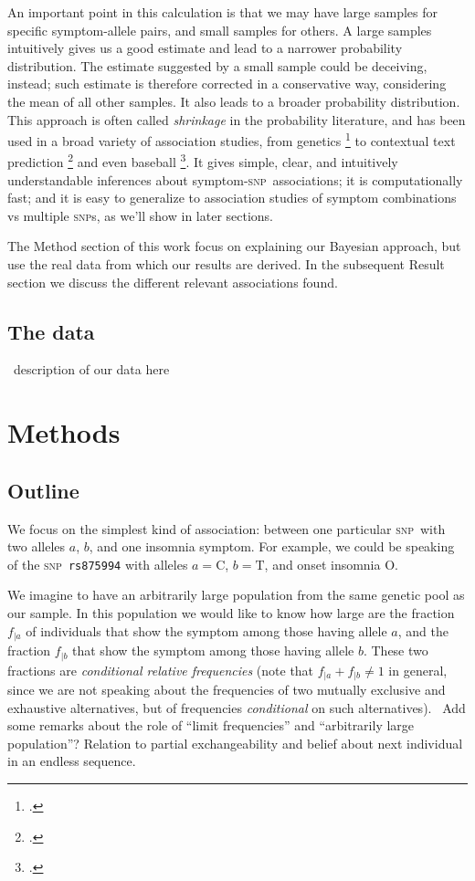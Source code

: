 \documentclass[\ifafour a4paper,12pt,\else a5paper,10pt,\fi%
onecolumn,oneside,article,%
british%
]{memoir}
\theoremstyle{remark}
\theoremstyle{innote}
\newcommand*{\citep}{\footcites}
\renewcommand*{\|}[1][]{\nonscript\,#1\vert\nonscript\;\mathopen{}}
\newcommand*{\puzzle}{{\fontencoding{U}\fontfamily{fontawesometwo}\selectfont\symbol{225}}}
\newcommand{\mynote}[1]{ {\color{notecolour}\puzzle\ #1}}
\newcommand*{\rs}{\texttt}
\newcommand*{\snp}{\textsc{snp}}
\newcommand*{\ya}{a}
\newcommand*{\yb}{b}
\newcommand*{\ysO}{\textrm{O}}%
\begin{document}
An important point in this calculation is that we may have large samples
for specific symptom-allele pairs, and small samples for others. A large
samples intuitively gives us a good estimate and lead to a narrower
probability distribution. The estimate suggested by a small sample could be
deceiving, instead; such estimate is therefore corrected in a conservative
way, considering the mean of all other samples. It also leads to a broader
probability distribution. This approach is often called \emph{shrinkage} in
the probability literature, and has been used in a broad variety of
association studies, from genetics \citep{lange1995,lockwoodetal2001} to
contextual text prediction \citep{mackayetal1995} and even baseball
\citep{jiangetal2010}. It gives simple, clear, and intuitively
understandable inferences about symptom-\snp\ associations; it is
computationally fast; and it is easy to generalize to association studies
of symptom combinations vs multiple \snp s, as we'll show in
later sections.

The Method section of this work focus on explaining our Bayesian approach,
but use the real data from which our results are derived. In the subsequent
Result section we discuss the different relevant associations found.


\subsection{The data}
\label{sec:data}

\mynote{description of our data here}

\section{Methods}
\label{sec:methods}

\subsection{Outline}
\label{sec:method_outline}

We focus on the simplest kind of association: between one particular \snp\
with two alleles $\ya$, $\yb$, and one insomnia symptom. For example, we
could be speaking of the \snp\ \rs{rs875994} with alleles $\ya=\textrm{C}$,
$\yb=\textrm{T}$, and onset insomnia $\ysO$.

We imagine to have an arbitrarily large population from the same genetic
pool as our sample. In this population we would like to know how large are
the fraction $f_{|\ya}$ of individuals that show the symptom among those
having allele $\ya$, and the fraction $f_{|\yb}$ that show the symptom among
those having allele $\yb$. These two fractions are \emph{conditional
  relative frequencies} (note that $f_{|\ya}+f_{|\yb} \ne 1$ in general,
since we are not speaking about the frequencies of two mutually exclusive
and exhaustive alternatives, but of frequencies \emph{conditional} on such
alternatives). \mynote{Add some remarks about the role of \enquote{limit
    frequencies} and \enquote{arbitrarily large population}? Relation to
  partial exchangeability and belief about next individual in an endless
  sequence.}
\end{document}
